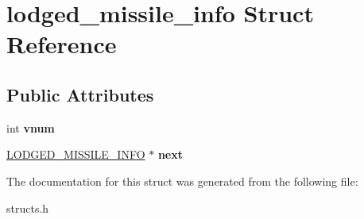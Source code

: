 \hypertarget{structlodged__missile__info}{\section{lodged\-\_\-missile\-\_\-info Struct Reference}
\label{structlodged__missile__info}
}
\subsection*{Public Attributes}
\begin{DoxyCompactItemize}
\item 
\hypertarget{structlodged__missile__info_ade946e71299b2a8e33c02020be47e236}{int {\bfseries vnum}}\label{structlodged__missile__info_ade946e71299b2a8e33c02020be47e236}

\item 
\hypertarget{structlodged__missile__info_a60fed130734a4ff21304fb3520c2f7da}{\hyperlink{structlodged__missile__info}{L\-O\-D\-G\-E\-D\-\_\-\-M\-I\-S\-S\-I\-L\-E\-\_\-\-I\-N\-F\-O} $\ast$ {\bfseries next}}\label{structlodged__missile__info_a60fed130734a4ff21304fb3520c2f7da}

\end{DoxyCompactItemize}


The documentation for this struct was generated from the following file\-:\begin{DoxyCompactItemize}
\item 
structs.\-h\end{DoxyCompactItemize}
